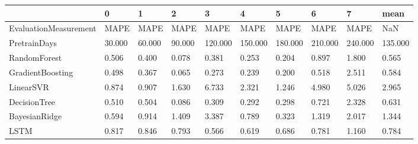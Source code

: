 \begin{tabular}{llllllllll}
\toprule
{} &      0 &      1 &      2 &       3 &       4 &       5 &       6 &       7 &    mean \\
\midrule
EvaluationMeasurement &   MAPE &   MAPE &   MAPE &    MAPE &    MAPE &    MAPE &    MAPE &    MAPE &     NaN \\
PretrainDays          & 30.000 & 60.000 & 90.000 & 120.000 & 150.000 & 180.000 & 210.000 & 240.000 & 135.000 \\
RandomForest          &  0.506 &  0.400 &  0.078 &   0.381 &   0.253 &   0.204 &   0.897 &   1.800 &   0.565 \\
GradientBoosting      &  0.498 &  0.367 &  0.065 &   0.273 &   0.239 &   0.200 &   0.518 &   2.511 &   0.584 \\
LinearSVR             &  0.874 &  0.907 &  1.630 &   6.733 &   2.321 &   1.246 &   4.980 &   5.026 &   2.965 \\
DecisionTree          &  0.510 &  0.504 &  0.086 &   0.309 &   0.292 &   0.298 &   0.721 &   2.328 &   0.631 \\
BayesianRidge         &  0.594 &  0.914 &  1.409 &   3.387 &   0.789 &   0.323 &   1.319 &   2.017 &   1.344 \\
LSTM                  &  0.817 &  0.846 &  0.793 &   0.566 &   0.619 &   0.686 &   0.781 &   1.160 &   0.784 \\
\bottomrule
\end{tabular}
